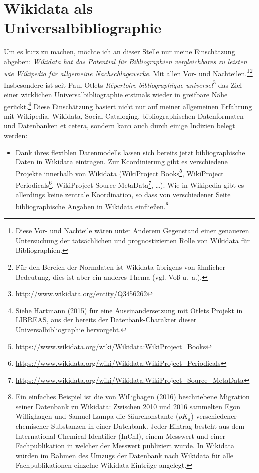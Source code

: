 \documentclass[a4paper,
fontsize=11pt,
oneside,
numbers=noperiodatend,
parskip=half-,
bibliography=totoc,
final
]{scrartcl}
\providecommand{\tightlist}{%
  \setlength{\itemsep}{0pt}\setlength{\parskip}{0pt}}
\begin{document}
\section*{Wikidata als
Universalbibliographie}\label{wikidata-als-universalbibliographie}

Um es kurz zu machen, möchte ich an dieser Stelle nur meine Einschätzung
abgeben: \emph{Wikidata hat das Potential für Bibliographien
vergleichbares zu leisten wie Wikipedia für allgemeine
Nachschlagewerke}. Mit allen Vor- und Nachteilen.\footnote{Diese Vor-
  und Nachteile wären unter Anderem Gegenstand einer genaueren
  Untersuchung der tatsächlichen und prognostizierten Rolle von Wikidata
  für Bibliographien.}\footnote{Für den Bereich der Normdaten ist
  Wikidata übrigens von ähnlicher Bedeutung, dies ist aber ein anderes
  Thema (vgl. Voß u.~a.).} Insbesondere ist seit Paul Otlets
\emph{Répertoire bibliographique universel}\footnote{\url{http://www.wikidata.org/entity/Q3456262}}
das Ziel einer wirklichen Universalbibliographie erstmals wieder in
greifbare Nähe gerückt.\footnote{Siehe Hartmann (2015) für eine
  Auseinandersetzung mit Otlets Projekt in LIBREAS, aus der bereits der
  Datenbank-Charakter dieser Universalbibliographie hervorgeht.} Diese
Einschätzung basiert nicht nur auf meiner allgemeinen Erfahrung mit
Wikipedia, Wikidata, Social Cataloging, bibliographischen Datenformaten
und Datenbanken et cetera, sondern kann auch durch einige Indizien
belegt werden:

\begin{itemize}
\tightlist
\item
  Dank ihres flexiblen Datenmodells lassen sich bereits jetzt
  bibliographische Daten in Wikidata eintragen. Zur Koordinierung gibt
  es verschiedene Projekte innerhalb von Wikidata (WikiProject
  Books\footnote{\url{https://www.wikidata.org/wiki/Wikidata:WikiProject_Books}},
  WikiProject Periodicals\footnote{\url{https://www.wikidata.org/wiki/Wikidata:WikiProject_Periodicals}},
  WikiProject Source MetaData\footnote{\url{https://www.wikidata.org/wiki/Wikidata:WikiProject_Source_MetaData}},
  \ldots{}). Wie in Wikipedia gibt es allerdings keine zentrale
  Koordination, so dass von verschiedener Seite bibliographische Angaben
  in Wikidata einfließen.\footnote{Ein einfaches Beispiel ist die von
    Willighagen (2016) beschriebene Migration seiner Datenbank zu
    Wikidata: Zwischen 2010 und 2016 sammelten Egon Willighagen und
    Samuel Lampa die Säurekonstante (\(pK_a\)) verschiedener chemischer
    Substanzen in einer Datenbank. Jeder Eintrag besteht aus dem
    International Chemical Identifier (InChI), einem Messwert und einer
    Fachpublikation in welcher der Messwert publiziert wurde. In
    Wikidata würden im Rahmen des Umzugs der Datenbank nach Wikidata für
    alle Fachpublikationen einzelne Wikidata-Einträge angelegt.}
\end{itemize}
\end{document}
